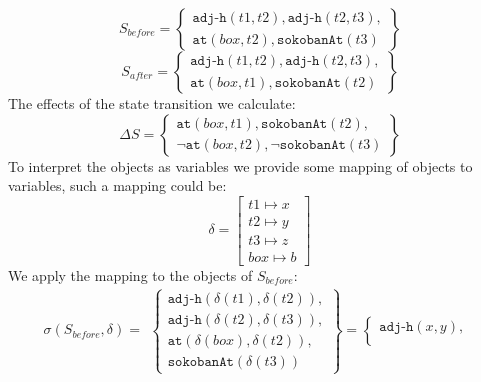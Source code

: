 \documentclass[\master/Master.tex]{subfiles}
\begin{document}
\begin{example}
	\begin{equation*}\label{eq:s_before}
		S_{before} =
		\left\{
		\begin{gathered}
			\texttt{adj-h}(t1, t2), \texttt{adj-h}(t2, t3), \\
			\texttt{at}(box,t2), \texttt{sokobanAt}(t3)
		\end{gathered}
		\right\}
	\end{equation*}
	\begin{equation*}
		S_{after} =
		\left\{
		\begin{gathered}
			\texttt{adj-h}(t1, t2), \texttt{adj-h}(t2, t3), \\
			\texttt{at}(box,t1), \texttt{sokobanAt}(t2)
		\end{gathered}
		\right\}
	\end{equation*}
	The effects of the state transition we calculate:
	\begin{equation*}
		\Delta S =
		\left\{
		\begin{gathered}
			\texttt{at}(box, t1), \texttt{sokobanAt}(t2), \\
			\neg\texttt{at}(box,t2), \neg\texttt{sokobanAt}(t3)
		\end{gathered}
		\right\}
	\end{equation*}
	To interpret the objects as variables we provide some mapping of objects to variables, such a mapping could be:
	\begin{equation*}
		\delta =
		\left [
		\begin{gathered}
			t1 \mapsto x \\
			t2 \mapsto y \\
			t3 \mapsto z \\
			box \mapsto b
		\end{gathered}
		\right ]
	\end{equation*}
	We apply the mapping to the objects of $S_{before}$:
	\begin{equation*}
		\sigma(S_{before}, \delta) =
		\begin{gathered}
			\left\{
			\begin{gathered}
				\texttt{adj-h}(\delta (t1), \delta (t2)), \\
				\texttt{adj-h}(\delta (t2), \delta (t3)), \\
				\texttt{at}(\delta (box),\delta (t2)), \\
				\texttt{sokobanAt}(\delta (t3))
			\end{gathered}
			\right\}
			=
			\left\{
			\begin{gathered}
				\texttt{adj-h}(x, y), \\

\end{gathered}
\end{gathered}
\end{equation*}
\end{example}
\end{document}
